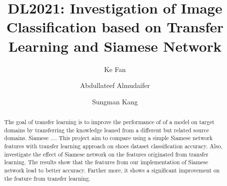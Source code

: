 \documentclass[sigconf]{acmart}
\begin{document}
\title{DL2021: Investigation of Image Classification based on Transfer Learning and Siamese Network}

  
\author{Ke Fan}
  
\author{Abdullateef Almudaifer}
  
\author{Sungman Kang}



\begin{abstract}
The goal of transfer learning is to improve the performance of of a model on target domains by transferring the knowledge leaned from a different but related source domains. Siamese .... This project aim to compare using a simple Siamese network features with transfer learning approach on shoes dataset classification accuracy. Also, investigate the effect of Siamese network on the features originated from transfer learning. The results show that the features from our implementation of Siamese network lead to better accuracy. Farther more, it shows a significant improvement on the feature from transfer learning.
\end{abstract}


\keywords{}

\maketitle

\end{document}
